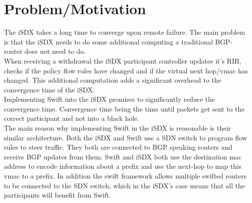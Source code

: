 
\chapter{\label{chapter2}Problem/Motivation}


The iSDX takes a long time to converge upon remote failure. The main problem is that the iSDX needs to do some additional computing a traditional BGP-router does not need to do. \\
When receiving a withdrawal the iSDX participant controller updates it's RIB, checks if the policy flow rules have changed and if the virtual next hop/vmac has changed. This additional computation adds a significant overhead to the convergence time of the iSDX. \\
Implementing Swift into the iSDX promises to significantly reduce the convergence time. Convergence time being the time until packets get sent to the correct participant and not into a black hole. \\
The main reason why implementing Swift in the iSDX is reasonable is their similar architecture. Both the iSDX and Swift use a SDN switch to program flow rules to steer traffic. They both are connected to BGP speaking routers and receive BGP updates from them. Swift and iSDX both use the destination mac address to encode information about a prefix and use the next-hop to map this vmac to a prefix. In addition the swift framework allows multiple swifted routers to be connected to the SDN switch, which in the iSDX's case means that all the participants will benefit from Swift.

